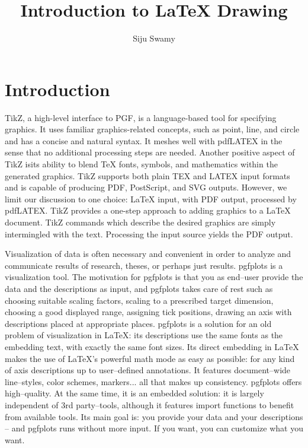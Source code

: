 \documentclass{article}
\title{Introduction to \LaTeX{} Drawing}
\author{Siju Swamy}
\begin{document}
\maketitle
\section{Introduction}
TikZ, a high-level interface to PGF, is a language-based tool for specifying graphics. It uses familiar graphics-related concepts, such as point, line, and circle and has a concise and natural syntax. It meshes well with pdfLATEX in the sense that no additional processing steps are needed. Another positive aspect of TikZ isits ability to blend \TeX{} fonts, symbols, and mathematics within the generated graphics. TikZ supports both plain TEX and LATEX input formats and is capable of producing
PDF, PostScript, and SVG outputs. However, we limit our discussion to one
choice: \LaTeX{} input, with PDF output, processed by pdfLATEX.
TikZ provides a one-step approach to adding graphics to a \LaTeX{} document.
TikZ commands which describe the desired graphics are simply intermingled
with the text. Processing the input source yields the PDF output.

Visualization of data is often necessary and convenient in order to analyze and communicate results of
research, theses, or perhaps just results.
pgfplots is a visualization tool. The motivation for pgfplots is that you as end–user provide the data
and the descriptions as input, and pgfplots takes care of rest such as choosing suitable scaling factors,
scaling to a prescribed target dimension, choosing a good displayed range, assigning tick positions, drawing
an axis with descriptions placed at appropriate places.
pgfplots is a solution for an old problem of visualization in \LaTeX{}: its descriptions use the same fonts
as the embedding text, with exactly the same font sizes. Its direct embedding in \LaTeX{} makes the use
of \LaTeX{}’s powerful math mode as easy as possible: for any kind of axis descriptions up to user–defined
annotations. It features document–wide line–styles, color schemes, markers... all that makes up consistency.
pgfplots offers high–quality. At the same time, it is an embedded solution: it is largely independent of
3rd party–tools, although it features import functions to benefit from available tools.
Its main goal is: you provide your data and your descriptions – and pgfplots runs without more input.
If you want, you can customize what you want.
\end{document}
